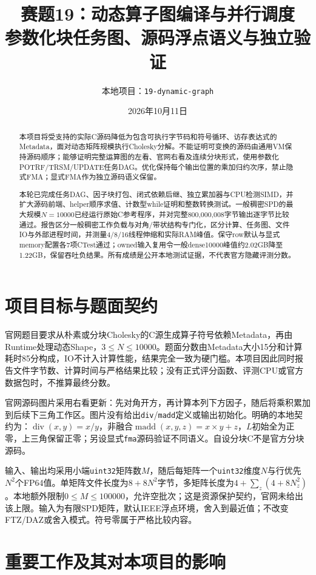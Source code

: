 \documentclass[UTF8,a4paper,11pt]{ctexart}
\title{赛题19：动态算子图编译与并行调度\\\large 参数化块任务图、源码浮点语义与独立验证}
\author{本地项目：\texttt{19-dynamic-graph}}
\date{2026年10月11日}
\begin{document}
\maketitle
\begin{abstract}
本项目将受支持的实际C源码降低为包含可执行字节码和符号循环、访存表达式的Metadata，面对动态矩阵规模执行Cholesky分解。不能证明可变换的源码由通用VM保持源码顺序；能够证明完整运算图的左看、官网右看及连续分块形式，使用参数化POTRF/TRSM/UPDATE任务DAG。优化保持每个输出位置的乘加归约次序，禁止隐式FMA；显式FMA作为独立源码语义保留。

本轮已完成任务DAG、因子块打包、闭式依赖后继、独立累加器与CPU检测SIMD，并扩大源码前端、helper顺序求值、计数型while证明和整数转换测试。一般稠密SPD的最大规模$N=10000$已经运行原始C参考程序，并对完整800,000,008字节输出逐字节比较通过。报告区分一般稠密工作负载与对角/带状结构专门化，区分计算、任务图、文件IO与外部进程时间，并测量4/8/16线程伸缩和实际RAM峰值。保守row默认与显式memory配置各7项CTest通过；owned输入复用令一般dense10000峰值约2.02GB降至1.22GB，保留吞吐负结果。所有成绩是公开本地测试证据，不代表官方隐藏评测分数。
\end{abstract}

\section{项目目标与题面契约}
官网题目要求从朴素或分块Cholesky的C源生成算子符号依赖Metadata，再由Runtime处理动态Shape，$3\leq N\leq10000$。题面分数由Metadata大小15分和计算耗时85分构成，IO不计入计算性能，结果完全一致为硬门槛\cite{official}。本项目因此同时报告文件字节数、计算时间与严格结果比较；没有正式评分函数、评测CPU或官方数据包时，不推算最终分数。

官网源码图片采用右看更新：先对角开方，再计算本列下方因子，随后将乘积累加到后续下三角工作区。图片没有给出\texttt{div}/\texttt{madd}定义或输出初始化。明确的本地契约为：$\operatorname{div}(x,y)=x/y$，非融合$\operatorname{madd}(x,y,z)=x\times y+z$，$L$初始全为正零，上三角保留正零；另设显式\texttt{fma}源码验证不同语义。自设分块C不是官方分块源码。

输入、输出均采用小端\texttt{uint32}矩阵数$M$，随后每矩阵一个\texttt{uint32}维度$N$与行优先$N^2$个FP64值。单矩阵文件长度为$8+8N^2$字节，多矩阵长度为$4+\sum_z(4+8N_z^2)$。本地额外限制$0\leq M\leq100000$，允许空批次；这是资源保护契约，官网未给出该上限。输入为有限SPD矩阵，默认IEEE浮点环境，舍入到最近值；不改变FTZ/DAZ或舍入模式。符号零属于严格比较内容。

\section{重要工作及其对本项目的影响}
\end{document}
